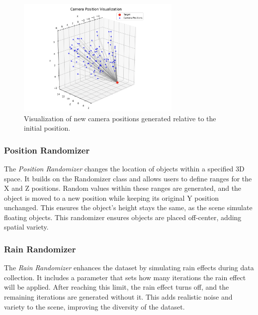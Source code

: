 \begin{figure}[H]
    \centering
    \includegraphics[width=0.7\textwidth]{Figures/camerapos.png}
    \caption{Visualization of new camera positions generated relative to the initial position.}
    \label{fig:camera_randomizer_plot}
    
\end{figure}

\subsubsection{Position Randomizer}
The \textit{Position Randomizer} changes the location of objects within a specified 3D space. It builds on the Randomizer class and allows users to define ranges for the X and Z positions. Random values within these ranges are generated, and the object is moved to a new position while keeping its original Y position unchanged. This ensures the object's height stays the same, as the scene simulate floating objects. This randomizer ensures objects are placed off-center, adding spatial variety.

\subsubsection{Rain Randomizer}
The \textit{Rain Randomizer} enhances the dataset by simulating rain effects during data collection. It includes a parameter that sets how many iterations the rain effect will be applied. After reaching this limit, the rain effect turns off, and the remaining iterations are generated without it. This adds realistic noise and variety to the scene, improving the diversity of the dataset.

